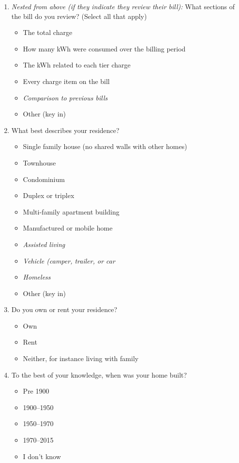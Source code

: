\documentclass{article}
\begin{document}
\begin{enumerate}
\item \textit{Nested from above (if they indicate they review their bill):}
What sections of the bill do you review? (Select all that apply)
\begin{itemize}
  \item[\checkbox] The total charge
  \item[\checkbox] How many kWh were consumed over the billing period
  \item[\checkbox] The kWh related to each tier charge
  \item[\checkbox] Every charge item on the bill
  \item[\checkbox] \textit{Comparison to previous bills}
  \item[\checkbox] Other (key in)
\end{itemize}
 

\item What best describes your residence?
\begin{itemize}
  \item[\checkbox] Single family house (no shared walls with other homes)
  \item[\checkbox] Townhouse
  \item[\checkbox] Condominium
  \item[\checkbox] Duplex or triplex
  \item[\checkbox] Multi-family apartment building
  \item[\checkbox] Manufactured or mobile home
  \item[\checkbox] \textit{Assisted living}
  \item[\checkbox] \textit{Vehicle (camper, trailer, or car}
  \item[\checkbox] \textit{Homeless}
  \item[\checkbox] Other (key in)
\end{itemize}
 

\item Do you own or rent your residence?
\begin{itemize}
  \item[\checkbox] Own
  \item[\checkbox] Rent
  \item[\checkbox] Neither, for instance living with family
\end{itemize}
 

\item To the best of your knowledge, when was your home built?
\begin{itemize}
  \item[\checkbox] Pre 1900
  \item[\checkbox] 1900--1950
  \item[\checkbox] 1950--1970
  \item[\checkbox] 1970--2015
  \item[\checkbox] I don't know
\end{itemize}
 


\end{enumerate}
\end{document}
